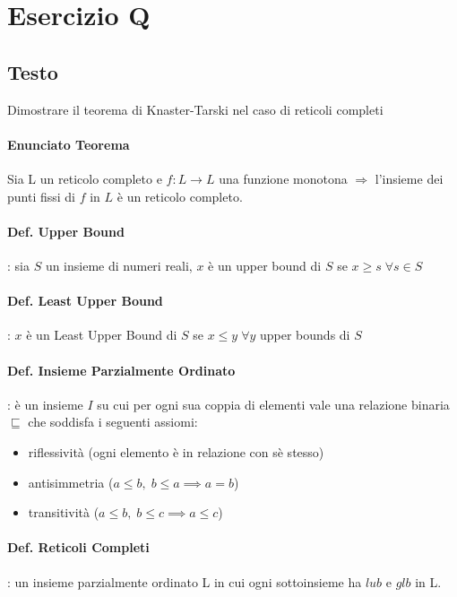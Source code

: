 \documentclass{article}
\begin{document}
\section{Esercizio Q}
\subsection{Testo}
Dimostrare il teorema di Knaster-Tarski nel caso di reticoli completi


\paragraph{Enunciato Teorema}

Sia L un reticolo completo e $f:L \to L$ una funzione monotona $\Rightarrow$ l'insieme dei punti fissi di $f$ in $L$ è un reticolo completo.

\paragraph{Def. Upper Bound}: sia $S$ un insieme di numeri reali, $x$ è un upper bound di $S$ se $x \geq s \;\forall s \in S$ 

\paragraph{Def. Least Upper Bound}: $x$ è un Least Upper Bound di $S$ se $x \leq y \; \forall y $ upper bounds di $S$

\paragraph{Def. Insieme Parzialmente Ordinato}: è un insieme $I$ su cui per ogni sua coppia di elementi vale una relazione binaria $\sqsubseteq$ che soddisfa i seguenti assiomi:
\begin{itemize}
\item riflessività (ogni elemento è in relazione con sè stesso)
\item antisimmetria ($a \leq b, \; b \leq a \implies a=b$)
\item transitività ($a \leq b, \; b \leq c \implies a \leq c$)
\end{itemize}



\paragraph{Def. Reticoli Completi}: un insieme parzialmente ordinato L in cui ogni sottoinsieme ha $lub$ e $glb$ in L.
\end{document}
